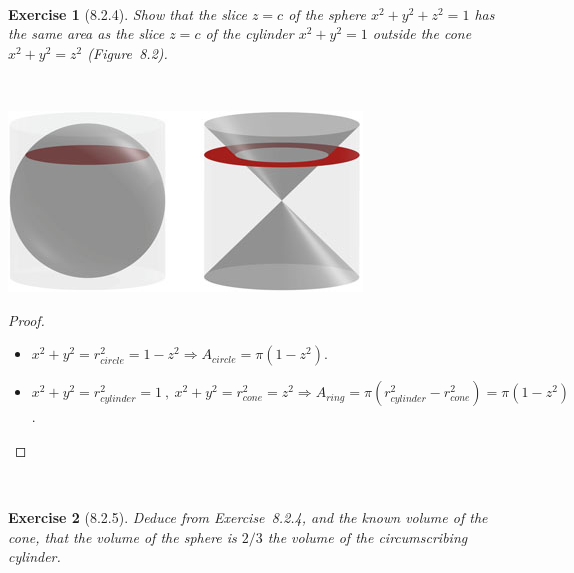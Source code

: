 \documentclass[12pt]{article}
\newcommand{\XB}{\color{black}}
\newcommand{\XBB}{\color{blue}}
\newcommand{\ds}{\displaystyle}
\theoremstyle{plain}
\newtheorem{ex}{Exercise}
\begin{document}
\XBB\hrulefill\XB \\
\begin{ex} [8.2.4]
  Show that the slice $ z = c $ of the sphere $ x^{2} + y^{2} + z^{2} = 1 $ has the same area as the slice $ z = c $ of the cylinder $ x^{2} + y^{2} = 1 $ outside the cone $ x^{2} + y^{2} = z^{2} $ (Figure~8.2).
\end{ex}
\XBB\hrulefill\XB \\

\begin{center}
  \includegraphics{8_2.jpg}
\end{center}

\begin{proof}
  \ \\

  \begin{itemize}
    \item $ \ds x^{2} + y^{2} = r_{circle}^{2} = 1 - z^{2} \Rightarrow A_{circle} = \pi(1 - z^{2}) $.
    \item $ \ds x^{2} + y^{2} = r_{cylinder}^{2} = 1 \ , \ x^{2} + y^{2} = r_{cone}^{2} = z^{2} \Rightarrow A_{ring} = \pi(r_{cylinder}^{2} - r_{cone}^{2}) = \pi(1 - z^{2}) $.
  \end{itemize}

\end{proof}

\newpage


\XBB\hrulefill\XB \\
\begin{ex} [8.2.5]
  Deduce from Exercise~8.2.4, and the known volume of the cone, that the volume of the sphere is $ 2 / 3 $ the volume of the circumscribing cylinder.
\end{ex}
\XBB\hrulefill\XB \\
\end{document}
